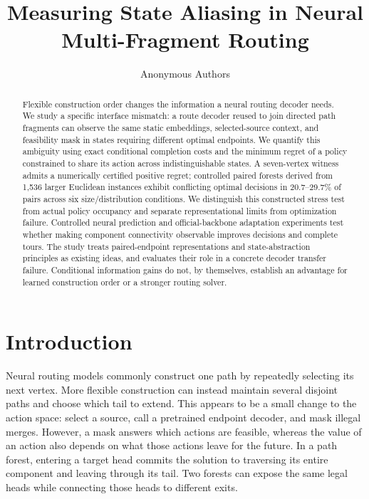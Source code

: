 \documentclass{article}
\title{Measuring State Aliasing in Neural Multi-Fragment Routing}
\author{Anonymous Authors}
\begin{document}
\maketitle

\begin{abstract}
Flexible construction order changes the information a neural routing decoder
needs. We study a specific interface mismatch: a route decoder reused to join
directed path fragments can observe the same static embeddings, selected-source
context, and feasibility mask in states requiring different optimal endpoints.
We quantify this ambiguity using exact conditional completion costs and the
minimum regret of a policy constrained to share its action across indistinguishable
states. A seven-vertex witness admits a numerically certified positive regret;
controlled paired forests derived from 1,536 larger Euclidean instances exhibit
conflicting optimal decisions in 20.7--29.7\% of pairs across six size/distribution
conditions. We distinguish this constructed stress test from actual policy
occupancy and separate representational limits from optimization failure.
Controlled neural prediction and official-backbone adaptation experiments test
whether making component connectivity observable improves decisions and complete
tours. The study treats paired-endpoint representations and state-abstraction
principles as existing ideas, and evaluates their role in a concrete decoder
transfer failure. Conditional information gains do not, by themselves, establish
an advantage for learned construction order or a stronger routing solver.
\end{abstract}

\section{Introduction}

Neural routing models commonly construct one path by repeatedly selecting its
next vertex. More flexible construction can instead maintain several disjoint
paths and choose which tail to extend. This appears to be a small change to the
action space: select a source, call a pretrained endpoint decoder, and mask
illegal merges. However, a mask answers which actions are feasible, whereas
the value of an action also depends on what those actions leave for the future.
In a path forest, entering a target head commits the solution to traversing
its entire component and leaving through its tail. Two forests can expose the
same legal heads while connecting those heads to different exits.
\end{document}
